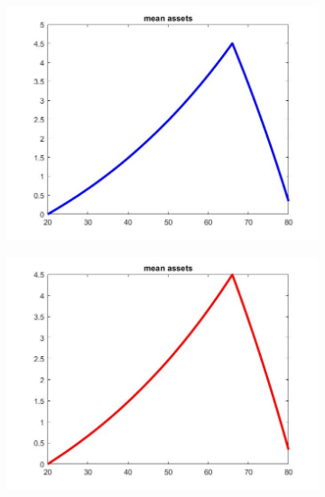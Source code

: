\documentclass[12pt,a4paper]{article}
\begin{document}
\begin{figure}[h!]
  \centering
  \begin{subfigure}[b]{0.32\linewidth}
    \includegraphics[width=\linewidth]{graphs/Q2/mean_asset.jpg}
  \end{subfigure}
  \begin{subfigure}[b]{0.32\linewidth}
      \includegraphics[width=\linewidth]{graphs/Q2/mean_asset2.jpg}
  \end{subfigure}
  \begin{subfigure}[b]{0.32\linewidth}

\end{subfigure}
\end{figure}
\end{document}
